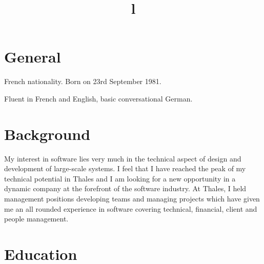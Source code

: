 \documentclass[overlapped,line,letterpaper]{res}
\begin{document}
\begin{resume}


  \section{\bf General}
  French nationality. Born on 23rd September 1981.

  Fluent in French and English, basic conversational German.


  \section{\bf Background}

  My interest in software lies very much in the technical aspect of
  design and development of large-scale systems. I feel that I
  have reached the peak of my technical potential in Thales and I am looking for
  a new opportunity in a dynamic company at the forefront of the software
  industry. At Thales, I held management positions developing teams and
  managing projects which have given me an all rounded experience in software
  covering technical, financial, client and people management.



  \section{\bf Education}

  \begin{format}
    \title{l}\\
    \body\\
  \end{format}


\end{resume}
\end{document}
